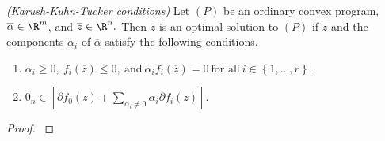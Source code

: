 %
\begin{ftheorem}
  \label{cv:ts:kkt}
  \emph{(Karush-Kuhn-Tucker conditions)}
  Let $(P)$
  be an ordinary convex program,
  $
  \overline{\alpha}
  \in \R^m
  $,
   and 
   $
   \overline{z}
   \in \R^n.
   $
   Then 
   $
   \overline{z}
   $
   is an optimal solution to $(P)$
   if  
   $
   \overline{z}
   $
   and 
   the components $\alpha_i$ of
   $
  \overline{\alpha}
   $
   satisfy 
   the following conditions.

  \begin{enumerate}[label={(\roman*)}]
    \item
      $
        \alpha_i \ge 0,
        \ 
        f_i(
   \overline{z}
        )
        \le 0,
        \ 
        \text{and}
        \ 
        \alpha_i 
        f_i(
   \overline{z}
        )
        =0
        \ 
        \text{for all}
        \ 
        i\in \left\{ 1, \ldots, r \right\}
      $.
      \item
        $
         0
         _n
         \in 
         [
          \partial
        f_0(
   \overline{z}
        )
        +
        \sum_{\alpha_i\neq 0}
        \alpha_i 
        \partial
        f_i(
   \overline{z}
        )
         ]
.
        $
  \end{enumerate}
\end{ftheorem}
\begin{proof}
  \cite[Theorem~28.3]{Rockafellar1970}
\end{proof}
